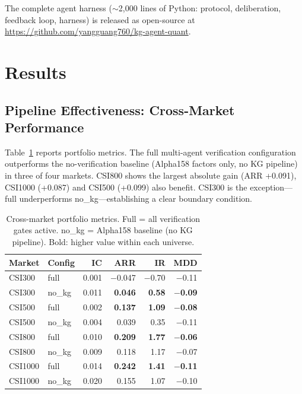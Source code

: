 \documentclass[sigconf]{acmart}
\begin{document}
The complete agent harness ($\sim$2,000 lines of Python: protocol, deliberation, feedback loop, harness) is released as open-source at \url{https://github.com/yangguang760/kg-agent-quant}.

\section{Results}

\subsection{Pipeline Effectiveness: Cross-Market Performance}

Table~\ref{tab:cross} reports portfolio metrics. The full multi-agent verification configuration outperforms the no-verification baseline (Alpha158 factors only, no KG pipeline) in three of four markets. CSI800 shows the largest absolute gain (ARR +0.091), CSI1000 (+0.087) and CSI500 (+0.099) also benefit. CSI300 is the exception---full underperforms no\_kg---establishing a clear boundary condition.

\begin{table}[t]
\caption{Cross-market portfolio metrics. Full = all verification gates active. no\_kg = Alpha158 baseline (no KG pipeline). Bold: higher value within each universe.}
\label{tab:cross}
\centering
\begin{tabular}{l l r r r r}
\toprule
Market & Config & IC & ARR & IR & MDD \\
\midrule
CSI300 & full & 0.001 & $-$0.047 & $-$0.70 & $-$0.11 \\
CSI300 & no\_kg & 0.011 & \textbf{0.046} & \textbf{0.58} & \textbf{$-$0.09} \\
CSI500 & full & 0.002 & \textbf{0.137} & \textbf{1.09} & \textbf{$-$0.08} \\
CSI500 & no\_kg & 0.004 & 0.039 & 0.35 & $-$0.11 \\
CSI800 & full & 0.010 & \textbf{0.209} & \textbf{1.77} & \textbf{$-$0.06} \\
CSI800 & no\_kg & 0.009 & 0.118 & 1.17 & $-$0.07 \\
CSI1000 & full & 0.014 & \textbf{0.242} & \textbf{1.41} & \textbf{$-$0.11} \\
CSI1000 & no\_kg & 0.020 & 0.155 & 1.07 & $-$0.10 \\
\bottomrule
\end{tabular}
\end{table}
\end{document}
